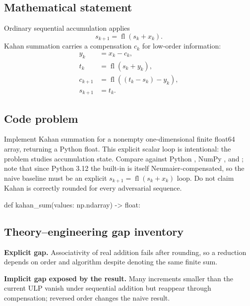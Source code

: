 
        \subsection{Mathematical statement}


Ordinary sequential accumulation applies
\[
  s_{k+1}=\operatorname{fl}(s_k+x_k).
\]
Kahan summation carries a compensation $c_k$ for low-order information:
\[
\begin{aligned}
y_k&=x_k-c_k,\\
t_k&=\operatorname{fl}(s_k+y_k),\\
c_{k+1}&=\operatorname{fl}((t_k-s_k)-y_k),\\
s_{k+1}&=t_k.
\end{aligned}
\]


        \subsection{Code problem}


Implement Kahan summation for a nonempty one-dimensional finite float64 array,
returning a Python float.  This explicit scalar loop is intentional: the problem
studies accumulation state.  Compare against Python , NumPy
, and ; note that since Python 3.12 the built-in
 is itself Neumaier-compensated, so the naive baseline must be an
explicit $s_{k+1}=\operatorname{fl}(s_k+x_k)$ loop.  Do not claim Kahan is
correctly rounded for every adversarial sequence.


        \begin{contractbox}
        \begin{Code}
        def kahan_sum(values: np.ndarray) -> float:
        \end{Code}
        \end{contractbox}

        \subsection{Theory--engineering gap inventory}

        \begin{gapbox}
        \textbf{Explicit gap.} Associativity of real addition fails after rounding, so a reduction depends on order and algorithm despite denoting the same finite sum.

        \textbf{Implicit gap exposed by the result.} Many increments smaller than the current ULP vanish under sequential addition but reappear through compensation; reversed order changes the naive result.
        \end{gapbox}

